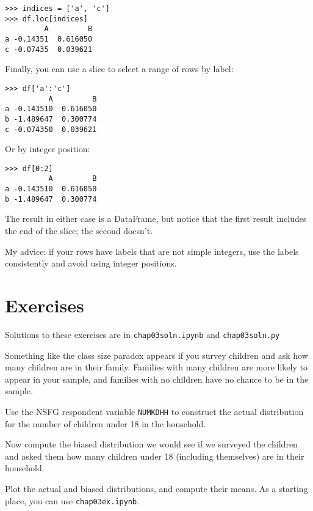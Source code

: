 \begin{verbatim}
>>> indices = ['a', 'c']
>>> df.loc[indices]
         A         B
a -0.14351  0.616050
c -0.07435  0.039621
\end{verbatim}

Finally, you can use a slice to select a range of rows by label:

\begin{verbatim}
>>> df['a':'c']
          A         B
a -0.143510  0.616050
b -1.489647  0.300774
c -0.074350  0.039621
\end{verbatim}

Or by integer position:

\begin{verbatim}
>>> df[0:2]
          A         B
a -0.143510  0.616050
b -1.489647  0.300774
\end{verbatim}

The result in either case is a DataFrame, but notice that the first
result includes the end of the slice; the second doesn't.

My advice: if your rows have labels that are not simple integers, use
the labels consistently and avoid using integer positions.



\section{Exercises}

Solutions to these exercises are in \verb"chap03soln.ipynb"
and \verb"chap03soln.py"

\begin{exercise}
Something like the class size paradox appears if you survey children
and ask how many children are in their family.  Families with many
children are more likely to appear in your sample, and
families with no children have no chance to be in the sample.

Use the NSFG respondent variable \verb"NUMKDHH" to construct the actual
distribution for the number of children under 18 in the household.

Now compute the biased distribution we would see if we surveyed the
children and asked them how many children under 18 (including themselves)
are in their household.  

Plot the actual and biased distributions, and compute their means.
As a starting place, you can use \verb"chap03ex.ipynb".
\end{exercise}


